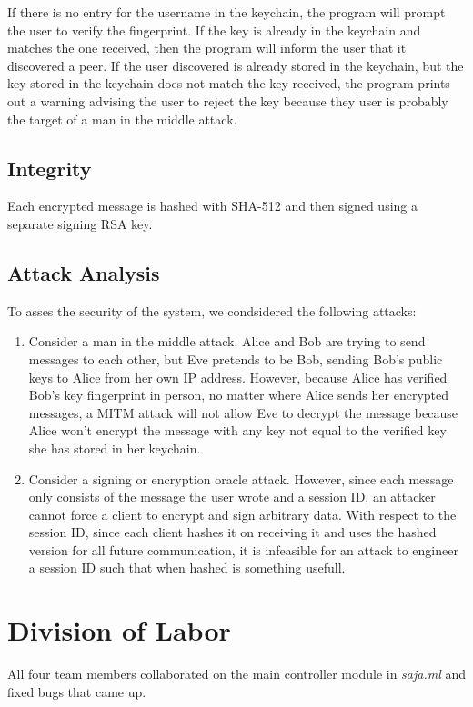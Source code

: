 \documentclass{scrartcl}
\begin{document}
If there is no entry for the username in the keychain, the program will prompt the user to verify the fingerprint. If the key is already in the keychain and matches the one received, then the program will inform the user that it discovered a peer. If the user discovered is already stored in the keychain, but the key stored in the keychain does not match the key received, the program prints out a warning advising the user to reject the key because they user is probably the target of a man in the middle attack.

\subsection{Integrity}

Each encrypted message is hashed with SHA-512 and then signed using a separate signing RSA key.

\subsection{Attack Analysis}
To asses the security of the system, we condsidered the following attacks:
\begin{enumerate}
\item Consider a man in the middle attack. Alice and Bob are trying to send messages to each other, but Eve pretends to be Bob, sending Bob's public keys to Alice from her own IP address. However, because Alice has verified Bob's key fingerprint in person, no matter where Alice sends her encrypted messages, a MITM attack will not allow Eve to decrypt the message because Alice won't encrypt the message with any key not equal to the verified key she has stored in her keychain.
\item Consider a signing or encryption oracle attack. However, since each message only consists of the message the user wrote and a session ID, an attacker cannot force a client to encrypt and sign arbitrary data. With respect to the session ID, since each client hashes it on receiving it and uses the hashed version for all future communication, it is infeasible for an attack to engineer a session ID such that when hashed is something usefull.
\end{enumerate}

\section{Division of Labor}

All four team members collaborated on the main controller module in \textit{saja.ml} and fixed bugs that came up.
\end{document}

